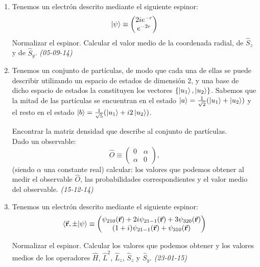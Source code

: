 \begin{enumerate}
    \item Tenemos un electrón descrito mediante el siguiente espinor:
    \[
    \ket{\psi} \equiv \begin{pmatrix} 2i e^{-r} \\ e^{-2r} \end{pmatrix}
    \]
    Normalizar el espinor. Calcular el valor medio de la coordenada radial, de $\hat{S}_z$ y de $\hat{S}_y$. \textit{(05-09-14)}


    \item Tenemos un conjunto de partículas, de modo que cada una de ellas se puede describir utilizando un espacio de estados de dimensión 2, y una base de dicho espacio de estados la constituyen los vectores $\{\ket{u_1}, \ket{u_2}\}$. Sabemos que la mitad de las partículas se encuentran en el estado $\ket{a} = \frac{1}{\sqrt{2}} (\ket{u_1} + \ket{u_2})$ y el resto en el estado $\ket{b} = \frac{1}{\sqrt{5}} (\ket{u_1} + i2 \ket{u_2})$.

    Encontrar la matriz densidad que describe al conjunto de partículas. \\
    Dado un observable:
    \[
    \hat{O} \equiv \begin{pmatrix} 0 & \alpha \\ \alpha & 0 \end{pmatrix},
    \]
    (siendo $\alpha$ una constante real) calcular: los valores que podemos obtener al medir el observable $\hat{O}$, las probabilidades correspondientes y el valor medio del observable. \textit{(15-12-14)}

    \item Tenemos un electrón descrito mediante el siguiente espinor:
    \[
    \langle \va{r}, \pm | \psi \rangle \equiv 
    \begin{pmatrix}
    \psi_{210}(\va{r}) + 2i \psi_{21-1}(\va{r}) + 3 \psi_{320}(\va{r}) \\
    (1 + i) \psi_{21-1}(\va{r}) + \psi_{310}(\va{r})
    \end{pmatrix}
    \]
    
    Normalizar el espinor. Calcular los valores que podemos obtener y los valores medios de los operadores \( \hat{H} \), \( \hat{L}^2 \), \( \hat{L}_z \), \( \hat{S}_z \) y \( \hat{S}_y \). \textit{(23-01-15)}


\end{enumerate}
